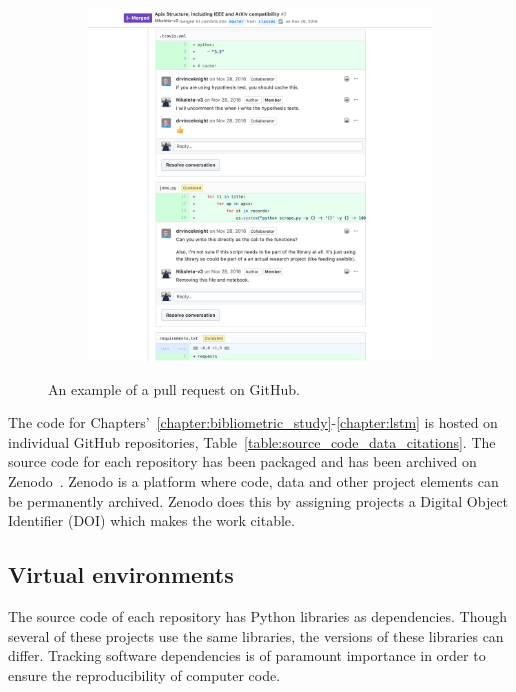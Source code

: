 \begin{figure}[!htbp]
\begin{subfigure}{0.5\textwidth}
    \includegraphics[width=\textwidth]{src/chapters/01/img/GitHub_discussion_two}
\end{subfigure}
\caption{An example of a pull request on GitHub.}\label{fig:pull_request_github}
\end{figure}

The code for Chapters'~\ref{chapter:bibliometric_study}-\ref{chapter:lstm} is
hosted on individual GitHub repositories,
Table~\ref{table:source_code_data_citations}. The source code for each
repository has been packaged and has been archived on Zenodo~\cite{zenodo}.
Zenodo is a platform where code, data and other project elements can be
permanently archived. Zenodo does this by assigning projects a Digital Object
Identifier (DOI) which makes the work citable.

\subsection{Virtual environments}

The source code of each repository has Python libraries as dependencies. Though
several of these projects use the same libraries, the versions of these
libraries can differ. Tracking software dependencies is of paramount importance
in order to ensure the reproducibility of computer code.

